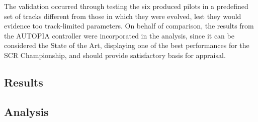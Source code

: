 	The validation occurred through testing the six produced pilots in a predefined set of tracks different from those
	in which they were evolved, lest they would evidence too track-limited parameters. On behalf of comparison, the
	results from the AUTOPIA controller were incorporated in the analysis, since it can be considered the State of
	the Art, displaying one of the best performances for the SCR Championship, and should provide satisfactory basis
	for appraisal.
	
\subsection{Results} \label{subsec:Results}

	
\subsection{Analysis} \label{subsec:Analysis}
	
	
	